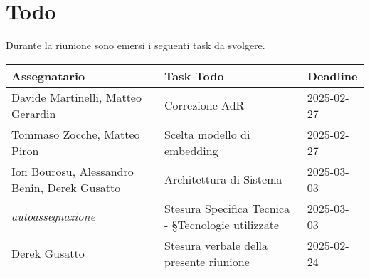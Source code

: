\section{Todo}
Durante la riunione sono emersi i seguenti task da svolgere.

\begin{center}
  \begin{tabular}{|L{4cm}|L{6cm}|L{3cm}|}
    \hline
    \textbf{Assegnatario} & \textbf{Task Todo} & \textbf{Deadline} \\ \hline
    Davide Martinelli, Matteo Gerardin &  Correzione AdR &  2025-02-27 \\ \hline
    Tommaso Zocche, Matteo Piron &  Scelta modello di embedding &  2025-02-27 \\ \hline
    Ion Bourosu, Alessandro Benin, Derek Gusatto &  Architettura di Sistema &  2025-03-03 \\ \hline
    \textit{autoassegnazione} & Stesura Specifica Tecnica - §Tecnologie utilizzate &  2025-03-03\\ \hline
    Derek Gusatto &  Stesura verbale della presente riunione &  2025-02-24 \\ \hline
  \end{tabular}
\end{center}